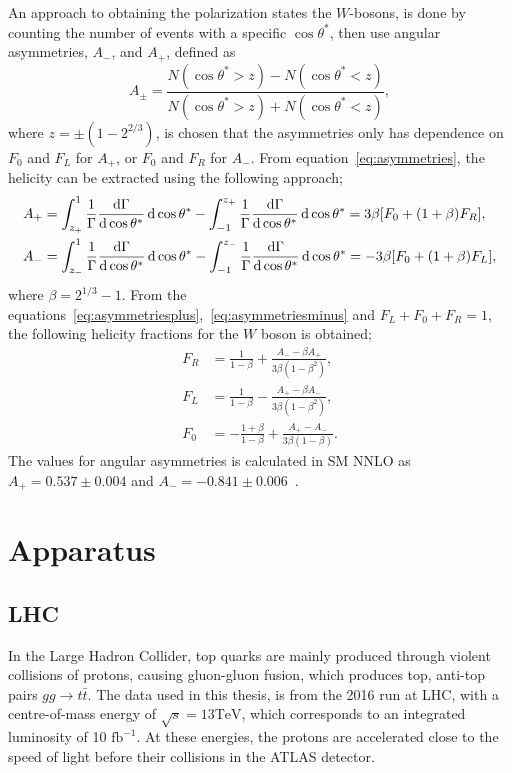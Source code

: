 \documentclass[12pt,a4paper]{article}
\numberwithin{equation}{section}
\begin{document}
An approach to obtaining the polarization states the $W$-bosons, is done by
counting the number of events with a specific $\cos \theta^*$, then use angular
asymmetries, $A_-$, and $A_+$, defined as
\begin{equation}\label{eq:asymmetries}
  A_{\pm}=\frac{N(\cos \theta^* > z)-N(\cos \theta^* < z)}{N(\cos \theta^* > z)+N(\cos \theta^* < z)},
\end{equation}
where $z=\pm(1-2^{2/3})$, is chosen that the asymmetries only has dependence on
$F_0$ and $F_L$ for $A_+$, or $F_0$ and $F_R$ for $A_-$. From
equation~\eqref{eq:asymmetries}, the helicity can be extracted using the
following approach;
\begin{align}
\label{eq:asymmetriesplus}
  A_+ &= \int^1_{z_+} \frac{1}{\Gamma}\dv{\Gamma}{\cos \theta^*} \dd{\cos \theta^{*}} - \int^{z_+}_{-1}
      \frac{1}{\Gamma}\dv{\Gamma}{\cos \theta^*} \dd{\cos \theta^{*}} = 3\beta [F_0 + (1+\beta)F_R],\\
\label{eq:asymmetriesminus}
  A_- &= \int^1_{z_-} \frac{1}{\Gamma}\dv{\Gamma}{\cos \theta^*} \dd{\cos \theta^{*}} - \int^{z_-}_{-1}
      \frac{1}{\Gamma}\dv{\Gamma}{\cos \theta^*} \dd{\cos \theta^{*}} = -3\beta [F_0 + (1+\beta)F_L],
\end{align}
where $\beta = 2^{1/3}-1$. From the
equations~\eqref{eq:asymmetriesplus},~\eqref{eq:asymmetriesminus} and
$F_L+F_0+F_R=1$, the following helicity fractions for the $W$ boson is obtained;
\begin{align}
  F_R&=\frac{1}{1-\beta}+\frac{A_- - \beta A_+}{3\beta (1-\beta^2)},\\
  F_L&=\frac{1}{1-\beta}-\frac{A_+ - \beta A_-}{3\beta (1-\beta^2)},\\
  F_0&=-\frac{1+\beta}{1-\beta}+\frac{A_+ - A_-}{3\beta (1-\beta)}.
\end{align}
The values for angular asymmetries is calculated in SM
NNLO as $A_+=0.537 \pm 0.004$ and
$A_-=-0.841 \pm 0.006$~\cite[24]{CastroNunesFiolhais:1544047}.

\section{Apparatus}
\subsection{LHC}
In the Large Hadron Collider, top quarks are mainly produced through violent
collisions of protons, causing gluon-gluon fusion, which produces top, anti-top
pairs $gg \rightarrow t\bar t$. The data used in this thesis, is from the 2016 run at LHC,
with a centre-of-mass energy of $\sqrt s = 13 \mathrm{TeV}$, which corresponds
to an integrated luminosity of 10 $\mathrm{fb}^{-1}$\cite{oreach2020}. At these
energies, the protons are accelerated close to the speed of light before their
collisions in the ATLAS detector.\\
\end{document}
